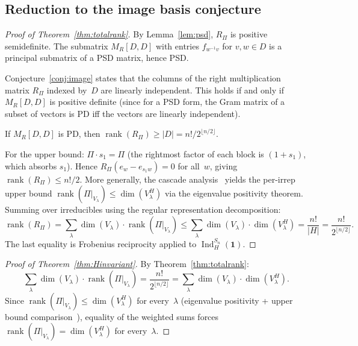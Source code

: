 \documentclass[11pt]{article}
\theoremstyle{definition}
\theoremstyle{remark}
\begin{document}
\subsection{Reduction to the image basis conjecture}

\begin{proof}[Proof of Theorem~\ref{thm:totalrank}]
By Lemma~\ref{lem:psd}, $R_\Pi$ is positive semidefinite.
The submatrix $M_R[D,D]$ with entries $f_{w^{-1}v}$ for $v, w \in D$
is a principal submatrix of a PSD matrix, hence PSD.

Conjecture~\ref{conj:image} states that the columns of the
right multiplication matrix $R_\Pi$ indexed by~$D$ are linearly independent.
This holds if and only if $M_R[D,D]$ is positive definite
(since for a PSD form, the Gram matrix of a subset of vectors is PD
iff the vectors are linearly independent).

If $M_R[D,D]$ is PD, then $\operatorname{rank}(R_\Pi) \geq |D| = n!/2^{\lfloor n/2 \rfloor}$.

For the upper bound: $\Pi \cdot s_1 = \Pi$ (the rightmost factor of
each block is $(1+s_1)$, which absorbs $s_1$).
Hence $R_\Pi(e_w - e_{s_1 w}) = 0$ for all~$w$,
giving $\operatorname{rank}(R_\Pi) \leq n!/2$.
More generally, the cascade analysis~\cite{Clio-cascade} yields
the per-irrep upper bound
$\operatorname{rank}(\Pi|_{V_\lambda}) \leq \dim(V_\lambda^H)$
via the eigenvalue positivity theorem.
Summing over irreducibles using the regular representation
decomposition:
\[
  \operatorname{rank}(R_\Pi)
  = \sum_\lambda \dim(V_\lambda) \cdot \operatorname{rank}(\Pi|_{V_\lambda})
  \leq \sum_\lambda \dim(V_\lambda) \cdot \dim(V_\lambda^H)
  = \frac{n!}{|H|}
  = \frac{n!}{2^{\lfloor n/2 \rfloor}}.
\]
The last equality is Frobenius reciprocity applied to
$\operatorname{Ind}_H^{S_n}(\mathbf{1})$.
\end{proof}

\begin{proof}[Proof of Theorem~\ref{thm:Hinvariant}]
By Theorem~\ref{thm:totalrank}:
\[
  \sum_\lambda \dim(V_\lambda) \cdot \operatorname{rank}(\Pi|_{V_\lambda})
  = \frac{n!}{2^{\lfloor n/2 \rfloor}}
  = \sum_\lambda \dim(V_\lambda) \cdot \dim(V_\lambda^H).
\]
Since $\operatorname{rank}(\Pi|_{V_\lambda}) \leq \dim(V_\lambda^H)$
for every~$\lambda$ (eigenvalue positivity + upper bound comparison~\cite{Clio-EP}),
equality of the weighted sums forces
$\operatorname{rank}(\Pi|_{V_\lambda}) = \dim(V_\lambda^H)$
for every~$\lambda$.
\end{proof}
\end{document}
